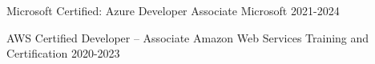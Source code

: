 

\begin{cvhonors}

  \cvhonor
    {Microsoft Certified: Azure Developer Associate} %
    {Microsoft} %
    {} %
    {2021-2024} %

  \cvhonor
    {AWS Certified Developer – Associate} %
    {Amazon Web Services Training and Certification} %
    {} %
    {2020-2023} %

\end{cvhonors}
